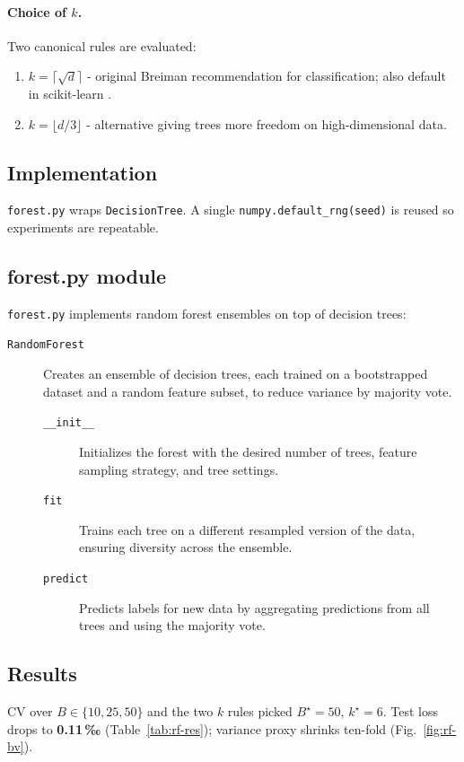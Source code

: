 \documentclass[12pt]{report}
\begin{document}
\paragraph{Choice of $k$.}
Two canonical rules are evaluated:

\begin{enumerate}
  \item $k=\lceil\sqrt d\rceil$ - original Breiman recommendation for
        classification; also default in scikit-learn
        \citep{pedregosa2011scikit}.

  \item $k=\lfloor d/3\rfloor$ - alternative giving trees more freedom 
        on high-dimensional data.
\end{enumerate}

\subsection{Implementation}
\texttt{forest.py} wraps \texttt{DecisionTree}.  A single
\texttt{numpy.default\_rng(seed)} is reused so experiments are repeatable.

\subsection{forest.py module}
\texttt{forest.py} implements random forest ensembles on top of decision trees:

\begin{description}
  \item[\texttt{RandomForest}]
        Creates an ensemble of decision trees, each trained on a bootstrapped
        dataset and a random feature subset, to reduce variance by majority vote.
    \begin{description}
      \item[\texttt{\_\_init\_\_}]
            Initializes the forest with the desired number of trees, feature sampling
            strategy, and tree settings.
      \item[\texttt{fit}]
            Trains each tree on a different resampled version of the data, ensuring
            diversity across the ensemble.
      \item[\texttt{predict}]
            Predicts labels for new data by aggregating predictions from all trees and
            using the majority vote.
    \end{description}
\end{description}

\subsection{Results}
CV over $B\!\in\!\{10,25,50\}$ and the two $k$ rules picked $B^\star=50$,
$k^\star=6$.  Test loss drops to \textbf{0.11\,‰} (Table~\ref{tab:rf-res});
variance proxy shrinks ten-fold (Fig.~\ref{fig:rf-bv}).
\end{document}
